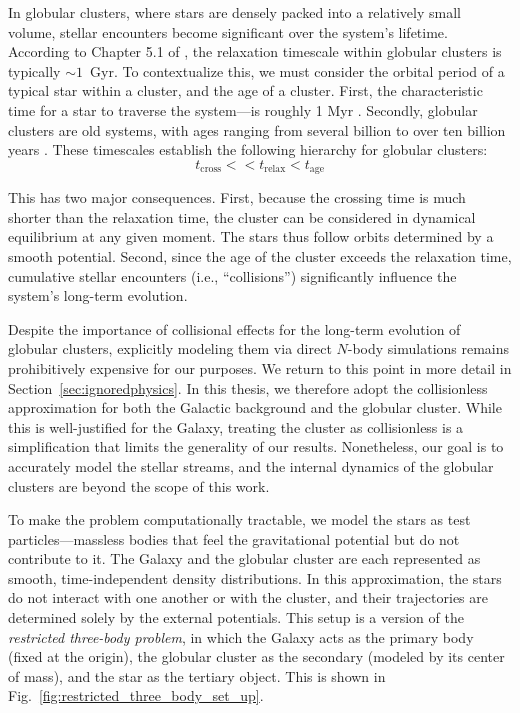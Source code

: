     In globular clusters, where stars are densely packed into a relatively small volume, stellar encounters become significant over the system's lifetime. According to Chapter 5.1 of \citet{bovy_inprep}, the relaxation timescale within globular clusters is typically $\sim1$~Gyr. To contextualize this, we must consider the orbital period of a typical star within a cluster, and the age of a cluster. First, the characteristic time for a star to traverse the system—is roughly 1 Myr \citep[which can be estimated as the size of a system divided by its internal velocity dispersion][]{2018MNRAS.478.1520B}. Secondly, globular clusters are old systems, with ages ranging from several billion to over ten billion years \citep{2013ApJ...775..134V}. These timescales establish the following hierarchy for globular clusters:
    \begin{equation*}
        t_\mathrm{cross} << t_\mathrm{relax} < t_\mathrm{age}
    \end{equation*}

    This has two major consequences. First, because the crossing time is much shorter than the relaxation time, the cluster can be considered in dynamical equilibrium at any given moment. The stars thus follow orbits determined by a smooth potential. Second, since the age of the cluster exceeds the relaxation time, cumulative stellar encounters (i.e., ``collisions'') significantly influence the system's long-term evolution.

    Despite the importance of collisional effects for the long-term evolution of globular clusters, explicitly modeling them via direct $N$-body simulations remains prohibitively expensive for our purposes. We return to this point in more detail in Section~\ref{sec:ignoredphysics}. In this thesis, we therefore adopt the collisionless approximation for both the Galactic background and the globular cluster. While this is well-justified for the Galaxy, treating the cluster as collisionless is a simplification that limits the generality of our results. Nonetheless, our goal is to accurately model the stellar streams, and the internal dynamics of the globular clusters are beyond the scope of this work.

    To make the problem computationally tractable, we model the stars as test particles—massless bodies that feel the gravitational potential but do not contribute to it. The Galaxy and the globular cluster are each represented as smooth, time-independent density distributions. In this approximation, the stars do not interact with one another or with the cluster, and their trajectories are determined solely by the external potentials. This setup is a version of the \textit{restricted three-body problem}, in which the Galaxy acts as the primary body (fixed at the origin), the globular cluster as the secondary (modeled by its center of mass), and the star as the tertiary object. This is shown in Fig.~\ref{fig:restricted_three_body_set_up}.

